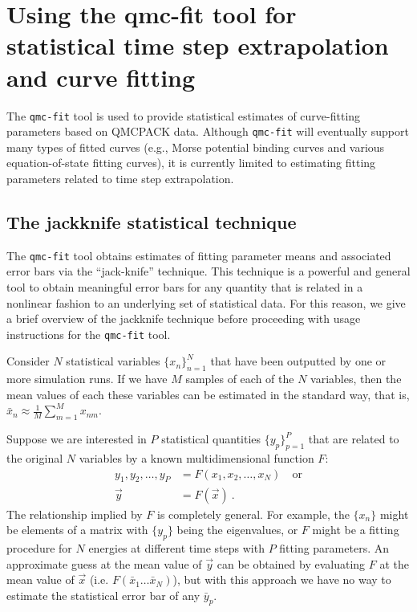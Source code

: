 \section{Using the qmc-fit tool for statistical time step extrapolation and curve fitting}
\label{sec:qmcfit}

The \texttt{qmc-fit} tool is used to provide statistical estimates of
curve-fitting parameters based on QMCPACK data.  Although \texttt{qmc-fit}
will eventually support many types of fitted curves (e.g., Morse
potential binding curves and various equation-of-state fitting curves),
it is currently limited to estimating fitting parameters related to
time step extrapolation.

\subsection{The jackknife statistical technique}
The \texttt{qmc-fit} tool obtains estimates of fitting parameter
means and associated error bars via the ``jack-knife''
technique.  This technique is a powerful and general tool
to obtain meaningful error bars for any quantity that is related
in a nonlinear fashion to an underlying set of statistical data.
For this reason, we give a brief overview of the jackknife
technique before proceeding with usage instructions for the
\texttt{qmc-fit} tool.

Consider $N$ statistical variables $\{x_n\}_{n=1}^N$ that have
been outputted by one or more simulation runs.  If we have
$M$ samples of each of the $N$ variables, then the mean values
of each these variables can be estimated in the standard way,
that is, $\bar{x}_n\approx \tfrac{1}{M}\sum_{m=1}^Mx_{nm}$.

Suppose we are interested in $P$ statistical quantities
$\{y_p\}_{p=1}^P$ that are related to the original $N$ variables
by a known multidimensional function $F$:
\begin{align}
  y_1,y_2,\ldots,y_P &= F(x_1,x_2,\ldots,x_N)\quad \textrm{or} \nonumber \\
  \vec{y} &= F(\vec{x})\:.
\end{align}
The relationship implied by $F$ is completely general. 
For example, the $\{x_n\}$ might be elements of a matrix
with $\{y_p\}$ being the eigenvalues, or $F$ might be
a fitting procedure for $N$ energies at different time steps
with $P$ fitting parameters.  An approximate guess at the mean
value of $\vec{y}$ can be obtained by evaluating $F$ at the mean
value of $\vec{x}$ (i.e. $F(\bar{x}_1\ldots\bar{x}_N)$), but with
this approach we have no way to estimate the statistical error 
bar of any $\bar{y}_p$.

